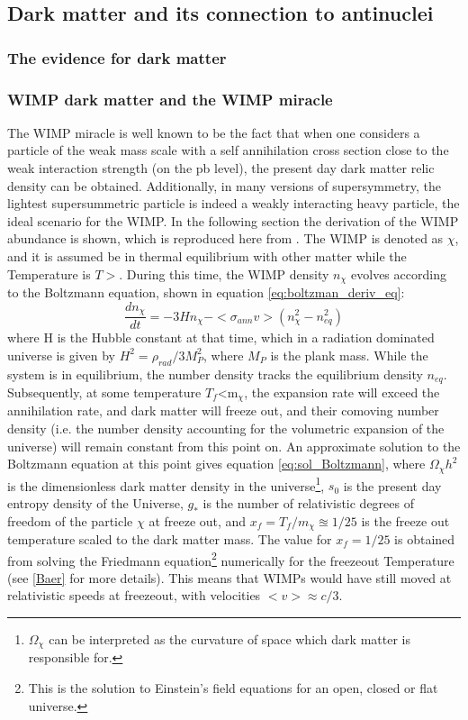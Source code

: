 \subsection{Dark matter and its connection to antinuclei}

\subsubsection{The evidence for dark matter}
\subsubsection{WIMP dark matter and the WIMP miracle}\label{sec:IntroWIMPs}
The WIMP miracle is well known to be the fact that when one considers a particle of the weak mass scale with a self annihilation cross section close to the weak interaction strength (on the pb level), the present day dark matter relic density can be obtained. Additionally, in many versions of supersymmetry, the lightest supersummetric particle is indeed a weakly interacting heavy particle, the ideal scenario for the WIMP\cite{}. In the following section the derivation of the WIMP abundance is shown, which is reproduced here from \cite{Baer-Choi-Kim}. The WIMP is denoted as $\chi$, and it is assumed be in thermal equilibrium with other matter while the Temperature is $T>$\dmm . During this time, the WIMP density $n_\chi$ evolves according to the Boltzmann equation, shown in equation \ref{eq:boltzman_deriv_eq}: 
\begin{equation}\label{eq:boltzman_deriv_eq}
    \frac{dn_\chi}{dt} = -3H n_\chi - <\sigma_{ann}v>(n_\chi^2 - n_{eq}^2)
\end{equation}
where H is the Hubble constant at that time, which in a radiation dominated universe is given by $H^2 = \rho_{rad}/3M^2_P$, where $M_P$ is the plank mass. While the system is in equilibrium, the number density tracks the equilibrium density $n_{eq}$. Subsequently, at some temperature $T_f$<m$_\chi$, the expansion rate will exceed the annihilation rate, and dark matter will freeze out, and their comoving number density (i.e. the number density accounting for the volumetric expansion of the universe) will remain constant from this point on. An approximate solution to the Boltzmann equation at this point gives equation \ref{eq:sol_Boltzmann}, where $\Omega_\chi h^2$ is the dimensionless dark matter density in the universe\footnote{$\Omega_\chi$ can be interpreted as the curvature of space which dark matter is responsible for.}, $s_0$ is the present day entropy density of the Universe, $g_*$ is the number of relativistic degrees of freedom of the particle $\chi$ at freeze out, and $x_f = T_f/m_\chi \approxeq 1/25$ is the freeze out temperature scaled to the dark matter mass. The value for $x_f=1/25$ is obtained from solving the Friedmann equation\footnote{This is the solution to Einstein's field equations for an open, closed or flat universe.} numerically for the freezeout Temperature (see \ref{Baer} for more details). This means that WIMPs would have still moved at relativistic speeds at freezeout, with velocities $<v>\approx c/3$. 

